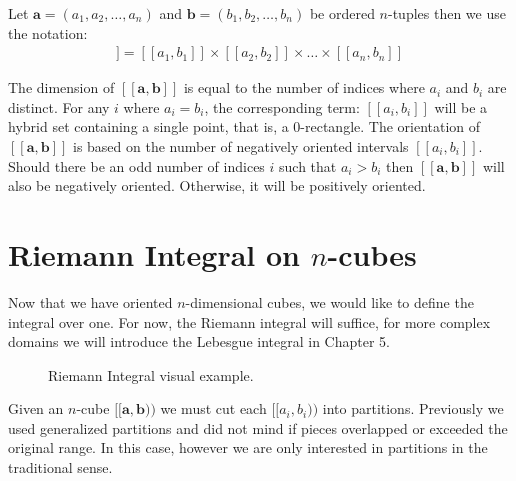 \begin{definition}
	Let $\boldsymbol{a} = (a_1, a_2, \ldots, a_n)$ and 
	$\boldsymbol{b} = (b_1, b_2, \ldots, b_n)$ be ordered $n$-tuples then we use the notation:
	\begin{align}
		[\![ \boldsymbol{a}, \boldsymbol{b} ]\!] 
		= [\![a_1, b_1]\!] \times [\![a_2, b_2 ]\!] \times \ldots \times [\![a_n , b_n]\!]
	\end{align}
\end{definition}

The dimension of $[\![ \boldsymbol{a}, \boldsymbol{b} ]\!]$ is equal to the number of indices where $a_i$ and $b_i$ are distinct.
For any $i$ where $a_i = b_i$, the corresponding term: $[\![ a_i, b_i ]\!]$ will be a hybrid set containing a single point, that is, a 0-rectangle.
The orientation of $[\![ \boldsymbol{a}, \boldsymbol{b} ]\!]$ is based on the number of negatively oriented intervals $[\![a_i,b_i]\!]$.
Should there be an odd number of indices $i$ such that $a_i > b_i$ then $[\![ \boldsymbol{a}, \boldsymbol{b} ]\!]$ will also be negatively oriented.
Otherwise, it will be positively oriented. 

\section{Riemann Integral on $n$-cubes}

Now that we have oriented $n$-dimensional cubes, we would like to define the integral over one.
For now, the Riemann integral will suffice, for more complex domains we will introduce the Lebesgue integral in Chapter 5.

\begin{figure}[h]
\caption[Riemann Integral]{Riemann Integral visual example.}
\centering
{}
\end{figure}

Given an $n$-cube $[\![\boldsymbol{a}, \boldsymbol{b})\!)$ we must cut each $[\![a_i, b_i)\!)$ into partitions.
Previously we used generalized partitions and did not mind if pieces overlapped or exceeded the original range.
In this case, however we are only interested in partitions in the traditional sense.

